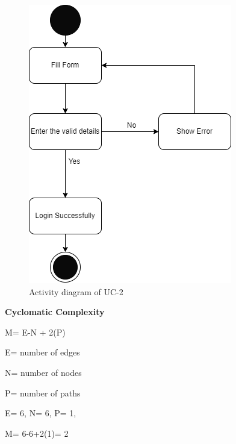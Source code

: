 \begin{figure}[H]
    \centering
    \includegraphics[scale=0.7]{./diagrams/Activity Diagram/ad-02.png}
    \caption{Activity diagram of UC-2}
    \label{fig:act-02}

\end{figure}

\textbf{Cyclomatic Complexity}

M= E-N + 2(P)

E= number of edges

N= number of nodes

P= number of paths

E= 6,
N= 6,
P= 1,

M= 6-6+2(1)= 2

